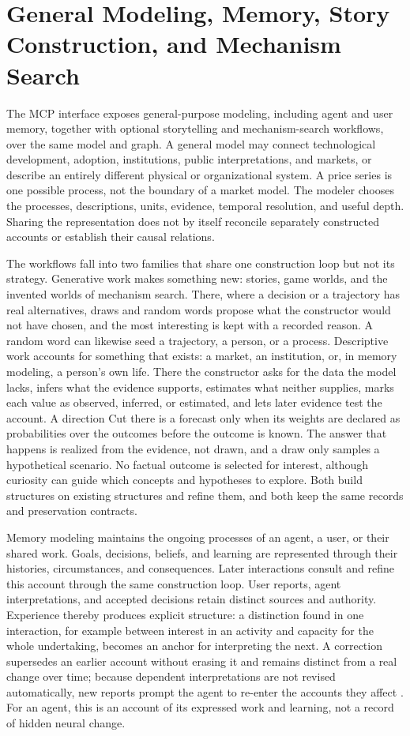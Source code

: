 \documentclass[11pt,a4paper]{article}
\begin{document}
\section{General Modeling, Memory, Story Construction, and Mechanism Search}
\label{sec:modeling-workflows}

The MCP interface exposes general-purpose modeling, including agent and user
memory, together with optional storytelling and mechanism-search workflows,
over the same model and graph. A general model
may connect technological development, adoption, institutions, public
interpretations, and markets, or describe an entirely different physical or
organizational system. A price series is one possible process, not the boundary
of a market model. The modeler chooses the processes, descriptions, units,
evidence, temporal resolution, and useful depth. Sharing the representation
does not by itself reconcile separately constructed accounts or establish their
causal relations.

The workflows fall into two families that share one construction loop but not
its strategy. Generative work makes something new: stories, game worlds, and the
invented worlds of mechanism search. There, where a decision or a trajectory has
real alternatives, draws and random words propose what the constructor would not
have chosen, and the most interesting is kept with a recorded reason. A random
word can likewise seed a trajectory, a person, or a process. Descriptive
work accounts for something that exists: a market, an institution, or, in
memory modeling, a person's own life. There the constructor asks for the data
the model lacks, infers what the evidence supports, estimates what neither
supplies, marks each value as observed, inferred, or estimated, and lets later
evidence test the account. A direction
Cut there is a forecast only when its weights are declared as probabilities over
the outcomes before the outcome is known. The answer that happens is realized
from the evidence, not drawn, and a draw only samples a hypothetical scenario.
No factual outcome is selected for interest, although curiosity can guide which
concepts and hypotheses to explore. Both build structures on existing structures and
refine them, and both keep the same records
and preservation contracts.

Memory modeling maintains the ongoing processes of an agent, a user, or their
shared work. Goals, decisions, beliefs, and learning are represented through
their histories, circumstances, and consequences. Later interactions consult
and refine this account through the same construction loop. User reports,
agent interpretations, and accepted decisions retain distinct sources and
authority. Experience thereby produces explicit structure: a distinction found
in one interaction, for example between interest in an activity and capacity for
the whole undertaking, becomes an anchor for interpreting the next. A correction
supersedes an earlier account without erasing it and remains distinct from a real
change over time; because dependent interpretations are not revised automatically,
new reports prompt the agent to re-enter the accounts they affect
\cite{westerbergUnderstanding2026}. For an agent, this is an account of its
expressed work and learning,
not a record of hidden neural change.
\end{document}
